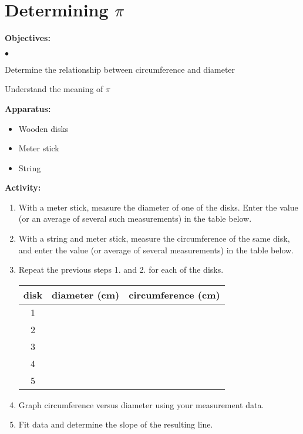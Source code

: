 
\section{Determining $\pi$}

\makelabheader %

{\noindent \bf Objectives:}

\begin{list}{$\bullet$}{\itemsep0pt }

\item Determine the relationship between circumference and diameter \item Understand the meaning of $\pi$

\end{list}

\textbf{Apparatus:}

\begin{itemize}
\item Wooden disks
\item Meter stick
\item String
\end{itemize}
{\noindent \bf Activity:}

\begin{enumerate}

\item With a meter stick, measure the diameter of one of the disks. Enter the value (or an average of several such measurements) in the table below.

\item With a string and meter stick, measure the circumference of the same disk, and enter the value (or average of several measurements) in the table below.

\item Repeat the previous steps 1. and 2. for each of the disks.

\begin{center} \begin{tabular}{|c|c|c|} \hline disk & diameter (cm) & circumference (cm) \\ \hline\hline 1 & & \\ \hline 2 & & \\ \hline 3 & & \\ \hline 4 & & \\ \hline 5 & & \\ \hline \end{tabular} \end{center}

\item Graph circumference versus diameter using your measurement data.

\item Fit data and determine the slope of the resulting line. \end{enumerate}


